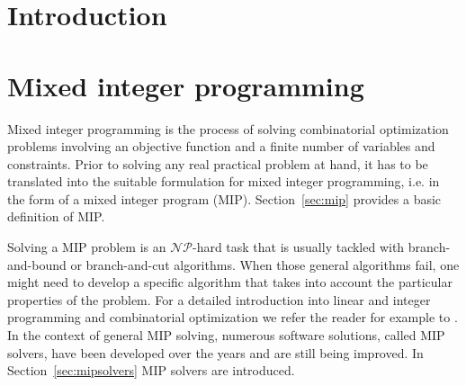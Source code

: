 \documentclass[a4paper,12pt,twoside]{scrbook}
\begin{document}
\tableofcontents

\pagestyle{headings}

\mainmatter

\chapter{Introduction}


\chapter{Mixed integer programming}
Mixed integer programming is the process of solving combinatorial optimization problems involving an objective function and a finite number of variables and constraints. Prior to solving any real practical problem at hand, it has to be translated into the suitable formulation for mixed integer programming, i.e. in the form of a mixed integer program (MIP). Section~\ref{sec:mip} provides a basic definition of MIP. \par 
Solving a MIP problem is an $\mathcal{NP}$-hard task that is usually tackled with branch-and-bound or branch-and-cut algorithms.
When those general algorithms fail, one might need to develop a specific algorithm that takes into account the particular properties of the problem.
For a detailed introduction into linear and integer programming and combinatorial optimization we refer the reader for example to \cite{fischetti2019}.
In the context of general MIP solving, numerous software solutions, called MIP solvers, have been developed over the years and are still being improved. In Section~\ref{sec:mipsolvers} MIP solvers are introduced.
\end{document}
